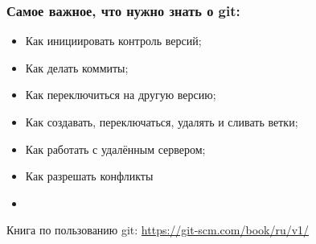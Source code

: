 \documentclass[]{beamer}
\begin{document}
\begin{frame} \frametitle{Самое важное, что нужно знать о git:}
	\begin{itemize}
		\item Как инициировать контроль версий;
		\item Как делать коммиты;
		\item Как переключиться на другую версию;
		\item Как создавать, переключаться, удалять и сливать ветки;
		\item Как работать с удалённым сервером;
		\item Как разрешать конфликты
		\item[~]
	\end{itemize}
	Книга по пользованию git: \newline
	\url{https://git-scm.com/book/ru/v1/}
\end{frame}
\end{document}

